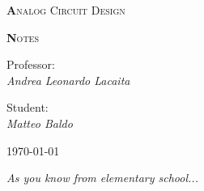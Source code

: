 \begin{titlepage}

	\centering
	{\scshape\huge\textbf Analog Circuit Design \par}
	{\scshape\huge\textbf Notes \par}	
	\vspace{13cm}
{Professor:\\ \textit{Andrea Leonardo Lacaita }}	

\vspace{0.5cm}

{Student:\\ \textit{Matteo Baldo}}


\vspace{2cm}
	\vfill
	\raggedleft
	{\today\par}

\vspace{1cm}
\raggedright
{ \it As you know from elementary school...}
	
\end{titlepage}
        \newpage
		\setcounter{page}{1}
        \null 
        \thispagestyle{empty} 
        \newpage  

\tableofcontents

